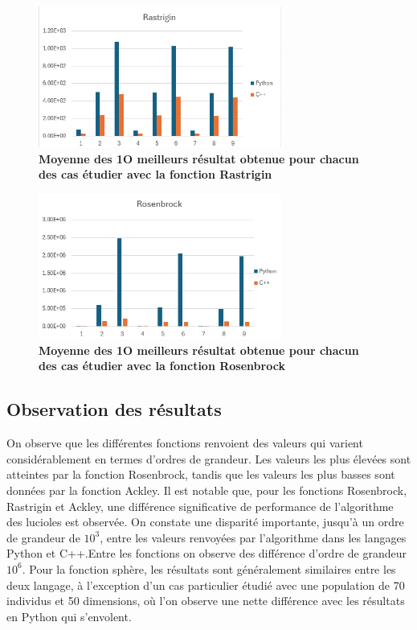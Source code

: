 \documentclass[conference]{IEEEtran}
\begin{document}
\begin{figure}[H]
  \centering
  \includegraphics[width=8cm]{rastrigin.png}
  \caption{\textbf {Moyenne des 1O meilleurs résultat obtenue pour chacun des cas étudier avec la fonction Rastrigin}}
  \label{fig:enter-label}
\end{figure}


\begin{figure}[H]
  \centering
  \includegraphics[width=8cm]{rosenbrock.png}
  \caption{\textbf {Moyenne des 1O meilleurs résultat obtenue pour chacun des cas étudier avec la fonction Rosenbrock}}
  \label{fig:enter-label}
\end{figure}

\subsection{Observation des résultats}

On observe que les différentes fonctions renvoient des valeurs qui varient considérablement en termes d'ordres de grandeur. Les valeurs les plus élevées sont atteintes par la fonction Rosenbrock, tandis que les valeurs les plus basses sont données par la fonction Ackley. Il est notable que, pour les fonctions Rosenbrock, Rastrigin et Ackley, une différence significative de performance de l'algorithme des lucioles est observée. On constate une disparité importante, jusqu'à un ordre de grandeur de $10^3$, entre les valeurs renvoyées par l'algorithme dans les langages Python et C++.Entre les fonctions on observe des différence d'ordre de grandeur $10^6$. Pour la fonction sphère, les résultats sont généralement similaires entre les deux langage, à l'exception d'un cas particulier étudié avec une population de 70 individus et 50 dimensions, où l'on observe une nette différence avec les résultats en Python qui s'envolent.
\end{document}
